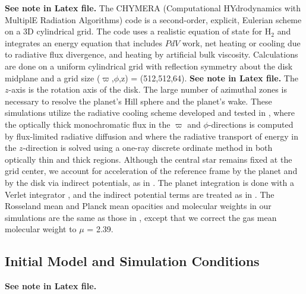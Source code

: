 \documentclass[12pt,manuscript,authoryear]{aastex}
\begin{document}
{\bf See note in Latex file.}
The CHYMERA (Computational HYdrodynamics with MultiplE Radiation Algorithms) code \citep{boley2007b} is a second-order, explicit, Eulerian scheme on a 3D cylindrical grid. The code uses a realistic equation of state for H$_2$ \citep{boley2007} and integrates an energy equation that includes $PdV$ work, net heating or cooling due to radiative flux divergence, and heating by artificial bulk viscosity. Calculations are done on a uniform cylindrical grid with reflection symmetry about the disk midplane and a grid size ($\varpi$,$\phi$,z) = (512,512,64). 
{\bf See note in Latex file.} 
The $z$-axis is the rotation axis of the disk. The large number of azimuthal zones is necessary to resolve the planet's Hill sphere and the planet's wake. These simulations utilize the radiative cooling scheme developed and tested in \citet{boley2007b}, where the optically thick monochromatic flux in the $\varpi$ and $\phi$-directions is computed by flux-limited radiative diffusion and where the radiative transport of energy in the $z$-direction is solved using a one-ray discrete ordinate method in both optically thin and thick regions. Although the central star remains fixed at the grid center, we account for acceleration of the reference frame by the planet and by the disk via indirect potentials, as in \citet{michael2010}. The planet integration is done with a Verlet integrator \citep[e.g.,][]{hut1995}, and the indirect potential terms are treated as in \citet{nelson2000a}. The Rosseland mean and Planck mean opacities and molecular weights in our simulations are the same as those in \citet{boley2006,boley2007b}, except that we correct the \citet{dalessio2001} gas mean molecular weight to $\mu$ = 2.39.

\subsection{Initial Model and Simulation Conditions}

{\bf See note in Latex file.}
\end{document}
